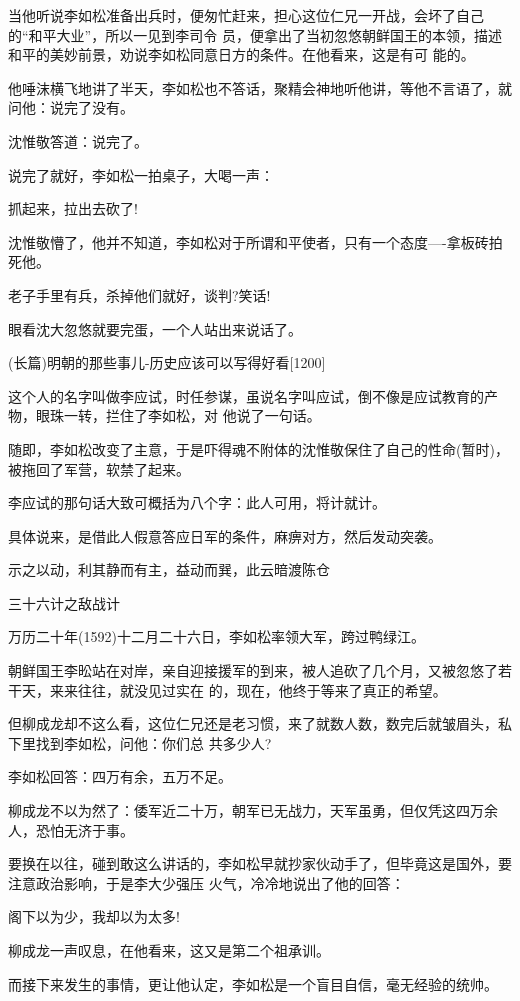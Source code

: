 \documentclass[11pt,a4paper,onecolumn]{article}
\begin{document}
当他听说李如松准备出兵时，便匆忙赶来，担心这位仁兄一开战，会坏了自己的``和平大业''，所以一见到李司令
员，便拿出了当初忽悠朝鲜国王的本领，描述和平的美妙前景，劝说李如松同意日方的条件。在他看来，这是有可
能的。

他唾沫横飞地讲了半天，李如松也不答话，聚精会神地听他讲，等他不言语了，就问他：说完了没有。

沈惟敬答道：说完了。

说完了就好，李如松一拍桌子，大喝一声：

抓起来，拉出去砍了!

沈惟敬懵了，他并不知道，李如松对于所谓和平使者，只有一个态度----拿板砖拍死他。

老子手里有兵，杀掉他们就好，谈判?笑话!

眼看沈大忽悠就要完蛋，一个人站出来说话了。

(长篇)明朝的那些事儿-历史应该可以写得好看$[$1200$]$

这个人的名字叫做李应试，时任参谋，虽说名字叫应试，倒不像是应试教育的产物，眼珠一转，拦住了李如松，对
他说了一句话。

随即，李如松改变了主意，于是吓得魂不附体的沈惟敬保住了自己的性命(暂时)，被拖回了军营，软禁了起来。

李应试的那句话大致可概括为八个字：此人可用，将计就计。

具体说来，是借此人假意答应日军的条件，麻痹对方，然后发动突袭。

示之以动，利其静而有主，益动而巽，此云暗渡陈仓

三十六计之敌战计

万历二十年(1592)十二月二十六日，李如松率领大军，跨过鸭绿江。

朝鲜国王李昖站在对岸，亲自迎接援军的到来，被人追砍了几个月，又被忽悠了若干天，来来往往，就没见过实在
的，现在，他终于等来了真正的希望。

但柳成龙却不这么看，这位仁兄还是老习惯，来了就数人数，数完后就皱眉头，私下里找到李如松，问他：你们总
共多少人?

李如松回答：四万有余，五万不足。

柳成龙不以为然了：倭军近二十万，朝军已无战力，天军虽勇，但仅凭这四万余人，恐怕无济于事。

要换在以往，碰到敢这么讲话的，李如松早就抄家伙动手了，但毕竟这是国外，要注意政治影响，于是李大少强压
火气，冷冷地说出了他的回答：

阁下以为少，我却以为太多!

柳成龙一声叹息，在他看来，这又是第二个祖承训。

而接下来发生的事情，更让他认定，李如松是一个盲目自信，毫无经验的统帅。
\end{document}

